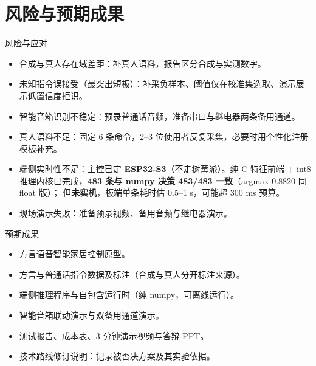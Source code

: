 \documentclass[10pt]{beamer}
\begin{document}
\section{风险与预期成果}
\begin{frame}{风险与应对}
    \begin{itemize}
        \item 合成与真人存在域差距：补真人语料，报告区分合成与实测数字。
        \item 未知指令误接受（最突出短板）：补采负样本、阈值仅在校准集选取、演示展示低置信度拒识。
        \item 智能音箱识别不稳定：预录普通话音频，准备串口与继电器两条备用通道。
        \item 真人语料不足：固定 6 条命令，2--3 位使用者反复采集，必要时用个性化注册模板补充。
        \item 端侧实时性不足：主控已定 \textbf{ESP32-S3}（不走树莓派）。纯 C 特征前端 + int8
              推理内核已完成，\textbf{483 条与 numpy 决策 483/483 一致}（argmax 0.8820 同 float 版）；
              但\textbf{未实机}，板端单条耗时估 0.5--1 s，可能超 300 ms 预算。
        \item 现场演示失败：准备预录视频、备用音频与继电器演示。
    \end{itemize}
\end{frame}
\begin{frame}{预期成果}
    \begin{itemize}
        \item 方言语音智能家居控制原型。
        \item 方言与普通话指令数据及标注（合成与真人分开标注来源）。
        \item 端侧推理程序与自包含运行时（纯 numpy，可离线运行）。
        \item 智能音箱联动演示与双备用通道演示。
        \item 测试报告、成本表、3 分钟演示视频与答辩 PPT。
        \item 技术路线修订说明：记录被否决方案及其实验依据。
    \end{itemize}
\end{frame}
\end{document}
